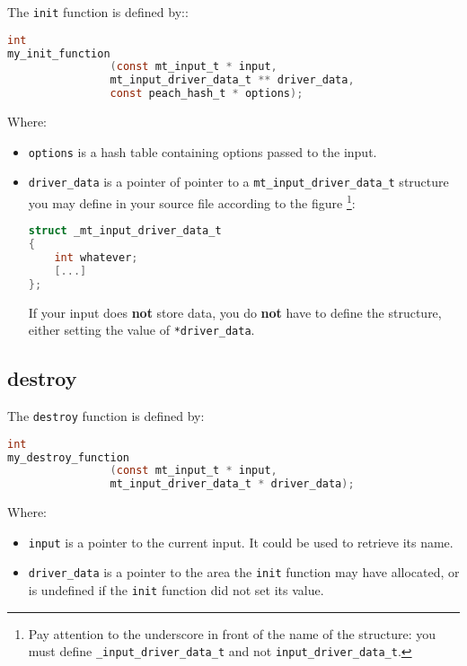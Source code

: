 The \texttt{init} function is defined by::
\begin{lstlisting}[language=C,
caption=Input's init function prototype]
int 
my_init_function
                (const mt_input_t * input,
                mt_input_driver_data_t ** driver_data, 
                const peach_hash_t * options);
\end{lstlisting}
Where: 
\begin{itemize}
\item \texttt{options} is a hash table containing options passed 
to the input.
\item \texttt{driver\_data} is a pointer of pointer to a 
\texttt{mt\_input\_driver\_data\_t} structure you may define in 
your source file according to the figure \footnote{Pay attention 
to the underscore in front of the name of the structure: you must define 
\texttt{\_input\_driver\_data\_t} and not
\texttt{input\_driver\_data\_t}.}:
\begin{lstlisting}[language=C,
caption=\_mt\_input\_driver\_data\_t structure]
struct _mt_input_driver_data_t
{
    int whatever;
    [...]
};
\end{lstlisting}
If your input does \textbf{not} store data, you do \textbf{not} have to define 
the structure, either setting the value of \texttt{*driver\_data}.
\end{itemize}

%
%
\subsection{destroy}
\label{sect:input_destroy}
The \texttt{destroy} function is defined by:
\begin{lstlisting}[language=C,
caption=Input's destroy function prototype]
int 
my_destroy_function
                (const mt_input_t * input,
                mt_input_driver_data_t * driver_data);
\end{lstlisting}
Where:
\begin{itemize}
\item \texttt{input} is a pointer to the current input.
It could be used to retrieve its name.
\item \texttt{driver\_data} is a pointer to the area the 
\texttt{init} function may have allocated, or is undefined if 
the \texttt{init} function did not set its value.
\end{itemize}

